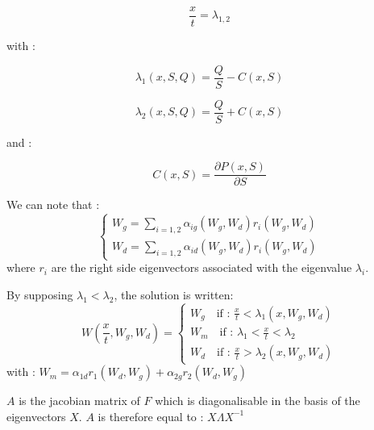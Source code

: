 \begin{equation}
  \frac{x}{t}=\lambda_{1,2}
\end{equation}

with :

\begin{equation}
 \lambda_1(x,S,Q) = \frac{Q}{S} - C(x,S)
\end{equation}

\begin{equation}
 \lambda_2(x,S,Q) = \frac{Q}{S} + C(x,S)
\end{equation}

and :

\begin{equation}
 C(x,S) = \frac{\partial P(x,S)}{\partial S}
\end{equation}

\vspace{0.5cm}

We can note that :
\begin{equation}
 \left \lbrace
  \begin{array}{l}
   W_g = \sum_{i=1,2} \alpha_{ig}(W_g,W_d) r_i(W_g,W_d) \\
   W_d = \sum_{i=1,2} \alpha_{id}(W_g,W_d) r_i(W_g,W_d)
\end{array}
 \right.
\end{equation}
where $r_i$ are the right side eigenvectors associated with the eigenvalue $\lambda_i$.

\vspace{0.5cm}

By supposing $\lambda_1 < \lambda_2$, the solution is written:
\begin{equation}
 W(\frac{x}{t},W_g , W_d ) = \left \lbrace
  \begin{array}{l}
   W_g \quad \mbox{if : } \frac{x}{t} < \lambda_1 (x,W_g,W_d) \\
   W_m \quad \mbox{if : } \lambda_1 < \frac{x}{t} < \lambda_2 \\
   W_d \quad \mbox{if : } \frac{x}{t} > \lambda_2 (x,W_g,W_d)
  \end{array}
 \right.
\end{equation}
with : $W_m = \alpha_{1d} r_1 (W_d,W_g) + \alpha_{2g} r_2 (W_d,W_g)$

\vspace{0.5cm}

$A$ is the jacobian matrix of $F$ which is diagonalisable in the basis of the eigenvectors $X$. $A$ is therefore equal to : $X \Lambda X^{-1}$

